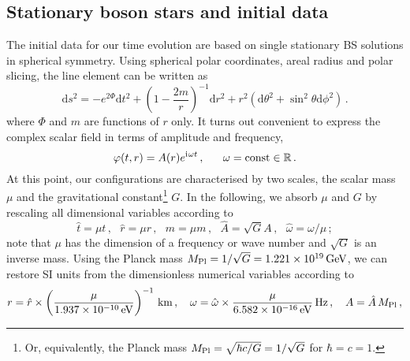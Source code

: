 \documentclass[11pt]{report}  %
\newcommand{\iu}{\mathrm{i}\mkern1mu}
\newcommand{\du}{\mathrm{d}}
\begin{document}
\subsection{Stationary boson stars and initial data}
%
The initial data for our time evolution are based on single stationary
BS solutions in spherical symmetry.
Using spherical polar coordinates,
areal radius and polar slicing, the
line element can be written as
%
\begin{equation}
  \du s^2 =
  -e^{2\Phi} \du t^2
  + \left(1-\frac{2m}{r}\right)^{-1} \du r^2
  + r^2
  (
  \du \theta^2
  + \sin^2\theta \du \phi^2
  )\,.
  \label{eq:ds2sym}
\end{equation}
%
where $\Phi$ and $m$ are functions of $r$ only.
It turns out convenient to express the complex
scalar field in terms of amplitude and frequency,
%
\begin{equation}
  \varphi(t,r) =
  A(r)
  e^{\iu \omega t}\,,~~~~~\omega = \mathrm{const}\in \mathbb{R}\,.
\end{equation}
%
At this point, our configurations are characterised by two
scales, the scalar mass $\mu$ and the gravitational
constant\footnote{Or, equivalently, the Planck mass
$M_{\rm Pl}=\sqrt{\hbar c/G}=1/\sqrt{G}$ for $\hbar=c=1$.} $G$.
In the following, we absorb $\mu$ and $G$ by rescaling all
dimensional variables according to
%
\begin{equation}
  \hat{t}=\mu t\,,~~~
  \hat{r}=\mu r\,,~~~
  \hat{m}=\mu m\,,~~~
  \hat{A}=\sqrt{G} A\,,~~~
  \hat{\omega}=\omega/\mu\,;
  \label{eq:rescaling}
\end{equation}
%
note that $\mu$ has the dimension of a frequency or wave number
and $\sqrt{G}$ is an inverse mass. Using the Planck mass
$M_{\rm Pl}=1/\sqrt{G}=1.221\times10^{19}\,{\rm GeV}$, we
can restore SI units from the dimensionless numerical variables
according to
%
\begin{equation}
  r = \hat{r} \times
  \left(
  \frac{\mu}{1.937\times 10^{-10}\,{\rm eV}}
  \right)^{-1}\,{\rm km}\,,~~~
  \omega = \hat{\omega}\times
  \frac{\mu}{6.582\times 10^{-16}\,{\rm eV}}\,{\rm Hz}
  \,,~~~
  A=\hat{A}\,M_{\rm Pl}\,,
  \nonumber
\end{equation}
\end{document}
